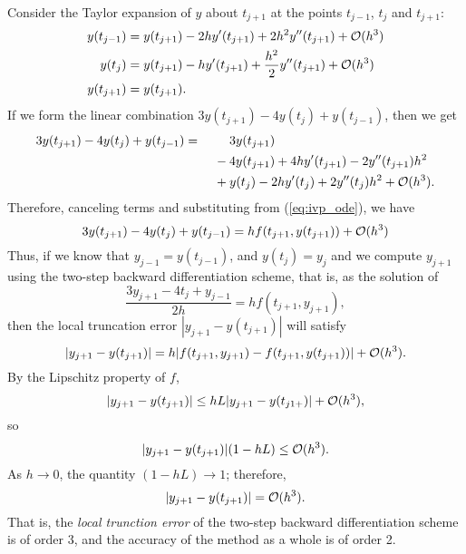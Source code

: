 \documentclass{homework}
\begin{document}
	\question 
	Consider the Taylor expansion of $y$ about $t_{j+1}$ at the points $t_{j-1}$, $t_j$ and $t_{j+1}$:
	\begin{align}
		y(t_{j-1}) &= y(t_{j+1}) - 2hy'(t_{j+1}) + 2h^2y''(t_{j+1}) + \mathcal{O}(h^3) \\
		y(t_j) &= y(t_{j+1}) - hy'(t_{j+1}) + \frac{h^2}{2}y''(t_{j+1}) + \mathcal{O}(h^3) \\
		y(t_{j+1}) &= y(t_{j+1}).
	\end{align}
	If we form the linear combination $3y(t_{j+1}) - 4y(t_j) + y(t_{j-1})$, then we get
	\begin{alignat}{2}
		3y(t_{j+1}) - 4y(t_j) + y(t_{j-1}) &{}={} &&3y(t_{j+1})\\
		&& {}-{} &4y(t_{j+1}) + 4hy'(t_{j+1}) - 2y''(t_{j+1})h^2 \\
		&&{}+{}&y(t_j)-2hy'(t_j) + 2y''(t_j)h^2 + \mathcal{O}(h^3).
	\end{alignat}
	Therefore, canceling terms and substituting from (\ref{eq:ivp_ode}), we have
	\begin{equation}
		3y(t_{j+1}) - 4y(t_j) + y(t_{j-1}) = hf(t_{j+1}, y(t_{j+1})) + \mathcal{O}(h^3)
	\end{equation}
	Thus, if we know that $y_{j-1} = y(t_{j-1})$, and $y(t_j) = y_j$ and we compute $y_{j+1}$ using the two-step backward differentiation scheme, that is, as the solution of
	\begin{equation}
		\label{p2:eq:2_step_backward}
		\frac{3y_{j+1} -4t_j + y_{j-1}}{2h} = hf(t_{j+1},y_{j+1}),
	\end{equation}
	then the local truncation error $|y_{j+1} - y(t_{j+1})|$ will satisfy
	\begin{equation}
		|y_{j+1} - y(t_{j+1})| = h|f(t_{j+1}, y_{j+1}) - f(t_{j+1}, y(t_{j+1}))| + \mathcal{O}(h^3).
	\end{equation}
	By the Lipschitz property of $f$,
	\begin{equation}
		|y_{j+1} - y(t_{j+1})| \le hL|y_{j+1}-y(t_{j1+})| + \mathcal{O}(h^3),
	\end{equation}
	so
	\begin{equation}
		|y_{j+1} - y(t_{j+1})|(1-hL) \le \mathcal{O}(h^3).
	\end{equation}
	As $h \to 0$, the quantity $(1-hL) \to 1$; therefore,
	\begin{equation}
		|y_{j+1} - y(t_{j+1})| = \mathcal{O}(h^3).
	\end{equation}
	That is, the \textit{local trunction error} of the two-step backward differentiation scheme is of order 3, and the accuracy of the method as a whole is of order 2.
	
\end{document}
